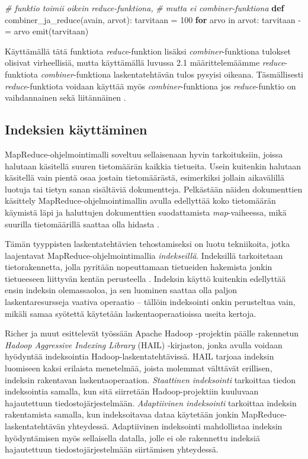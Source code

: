 \documentclass[finnish]{templates/tktltiki2}
\newenvironment{Shaded}{}{}
\newcommand{\KeywordTok}[1]{\textcolor[rgb]{0.00,0.44,0.13}{\textbf{{#1}}}}
\newcommand{\DecValTok}[1]{\textcolor[rgb]{0.25,0.63,0.44}{{#1}}}
\newcommand{\CommentTok}[1]{\textcolor[rgb]{0.38,0.63,0.69}{\textit{{#1}}}}
\newcommand{\NormalTok}[1]{{#1}}
\theoremstyle{definition}
\theoremstyle{remark}
\begin{document}
\begin{Shaded}
\begin{Highlighting}[]
\CommentTok{# funktio toimii oikein reduce-funktiona,}
\CommentTok{# mutta ei combiner-funktiona}
\KeywordTok{def} \NormalTok{combiner_ja_reduce(avain, arvot):}
    \NormalTok{tarvitaan = }\DecValTok{100}
    \KeywordTok{for} \NormalTok{arvo in arvot:}
        \NormalTok{tarvitaan -= arvo}
    \NormalTok{emit(tarvitaan)}
\end{Highlighting}
\end{Shaded}

Käyttämällä tätä funktiota \emph{reduce}-funktion lisäksi
\emph{combiner}-funktiona tulokset olisivat virheellisiä, mutta
käyttämällä luvussa 2.1 määrittelemäämme \emph{reduce}-funktiota
\emph{combiner}-funktiona laskentatehtävän tulos pysyisi oikeana.
Täsmällisesti \emph{reduce}-funktiota voidaan käyttää myös
\emph{combiner}-funktiona jos \emph{reduce}-funktio on vaihdannainen
sekä liitännäinen \cite{mapreduce}.

\subsection{Indeksien käyttäminen}\label{indeksien-kuxe4yttuxe4minen}

MapReduce-ohjelmointimalli soveltuu sellaisenaan hyvin tarkoituksiin,
joissa halutaan käsitellä suuren tietomäärän kaikkia tietueita. Usein
kuitenkin halutaan käsitellä vain pientä osaa jostain tietomäärästä,
esimerkiksi jollain aikavälillä luotuja tai tietyn sanan sisältäviä
dokumentteja. Pelkästään näiden dokumenttien käsittely
MapReduce-ohjelmointimallin avulla edellyttää koko tietomäärän käymistä
läpi ja haluttujen dokumenttien suodattamista \emph{map}-vaiheessa, mikä
suurilla tietomäärillä saattaa olla hidasta \cite{hail}.

Tämän tyyppisten laskentatehtävien tehostamiseksi on luotu tekniikoita,
jotka laajentavat MapReduce-ohjelmointimallia \emph{indekseillä}.
Indeksillä tarkoitetaan tietorakennetta, jolla pyritään nopeuttamaan
tietueiden hakemista jonkin tietueeseen liittyvän kentän perusteella
\cite{indexing}. Indeksin käyttö kuitenkin edellyttää ensin indeksin
olemassaoloa, ja sen luominen saattaa olla paljon laskentaresursseja
vaativa operaatio -- tällöin indeksointi onkin perusteltua vain, mikäli
samaa syötettä käytetään laskentaoperaatioissa useita kertoja.

Richer ja muut esittelevät työssään \cite{hail} Apache Hadoop
-projektin päälle rakennetun \emph{Hadoop Aggressive Indexing Library}
(HAIL) -kirjaston, jonka avulla voidaan hyödyntää indeksointia
Hadoop-laskentatehtävissä. HAIL tarjoaa indeksin luomiseen kaksi
erilaista menetelmää, joista molemmat välttävät erillisen, indeksin
rakentavan laskentaoperaation. \emph{Staattinen indeksointi} tarkoittaa
tiedon indeksointia samalla, kun sitä siirretään Hadoop-projektiin
kuuluvaan hajautettuun tiedostojärjestelmään. \emph{Adaptiivinen
indeksointi} tarkoittaa indeksin rakentamista samalla, kun indeksoitavaa
dataa käytetään jonkin MapReduce-laskentatehtävän yhteydessä.
Adaptiivinen indeksointi mahdollistaa indeksin hyödyntämisen myös
sellaisella datalla, jolle ei ole rakennettu indeksiä hajautettuun
tiedostojärjestelmään siirtämisen yhteydessä.
\end{document}
